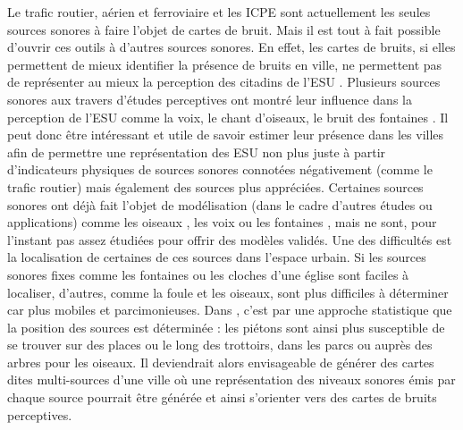 Le trafic routier, aérien et ferroviaire et les ICPE sont actuellement les seules sources sonores à faire l'objet de cartes de bruit. Mais il est tout à fait possible d'ouvrir ces outils à d'autres sources sonores. 
En effet, les cartes de bruits, si elles permettent de mieux identifier la présence de bruits en ville, ne permettent pas de représenter au mieux la perception des citadins de l'ESU \cite{brown2012review}. Plusieurs sources sonores aux travers d'études perceptives ont montré leur influence dans la perception de l'ESU comme la voix, le chant d'oiseaux, le bruit des fontaines \cite{lavandier2006contribution,hong2013designing}. 
Il peut donc être intéressant et utile de savoir estimer leur présence dans les villes afin de permettre une représentation des ESU non plus juste à partir d'indicateurs physiques de sources sonores connotées négativement (comme le trafic routier) mais également des sources plus appréciées.  
Certaines sources sonores ont déjà fait l'objet de modélisation (dans le cadre d'autres études ou applications) comme les oiseaux \cite{nemeth2013bird}, les voix \cite{hayne2011prediction} ou les fontaines \cite{watts2009measurement}, mais ne sont, pour l'instant pas assez étudiées pour offrir des modèles validés. 
Une des difficultés est la localisation de certaines de ces sources dans l'espace urbain. Si les sources sonores fixes comme les fontaines ou les cloches d'une église sont faciles à localiser, d'autres, comme la foule et les oiseaux, sont plus difficiles à déterminer car plus mobiles et parcimonieuses. Dans \cite{aumond2018probabilistic}, c'est par une approche statistique que la position des sources est déterminée : les piétons sont ainsi plus susceptible de se trouver sur des places ou le long des trottoirs, dans les parcs ou auprès des arbres pour les oiseaux. Il deviendrait alors envisageable de générer des cartes dites multi-sources d'une ville où une représentation des niveaux sonores émis par chaque source pourrait être générée et ainsi s'orienter vers des cartes de bruits perceptives.



